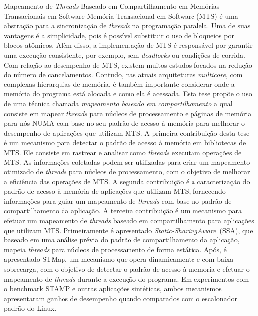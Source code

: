 \documentclass[tese,capa,english]{texufpel}
\begin{document}
\begin{englishabstract}{Mapeamento de \textit{Threads} Baseado em Compartilhamento em Memórias Transacionais em Software}
Memória Transacional em Software (MTS) é uma abstração para a sincronização de \textit{threads} na programação paralela. Uma de suas vantagens é a simplicidade, pois é possível substituir o uso de bloqueios por blocos atômicos. Além disso, a implementação de MTS é responsável por garantir uma execução consistente, por exemplo, sem \textit{deadlocks} ou condições de corrida. Com relação ao desempenho de MTS, existem muitos estudos focados na redução do número de cancelamentos. Contudo, nas atuais arquiteturas \textit{multicore}, com complexas hierarquias de memória, é também importante considerar onde a memória do programa está alocada e como ela é acessada. Esta tese propõe o uso de uma técnica chamada \emph{mapeamento baseado em compartilhamento} a qual consiste em mapear \textit{threads} para núcleos de processamento e páginas de memória para nós NUMA com base no seu padrão de acesso à memória para melhorar o desempenho de aplicações que utilizam MTS. A primeira contribuição desta tese é um mecanismo para detectar o padrão de acesso à memória em bibliotecas de MTS. Ele consiste em rastrear e analisar como \textit{threads} executam operações de MTS. As informações coletadas podem ser utilizadas para criar um mapeamento otimizado de \textit{threads} para núcleos de processamento, com o objetivo de melhorar a eficiência das operações de MTS. A segunda contribuição é a caracterização do padrão de acesso à memória de aplicações que utilizam MTS, fornecendo informações para guiar um mapeamento de \textit{threads} com base no padrão de compartilhamento da aplicação. A terceira contribuição é um mecanismo para efetuar um mapeamento de \textit{threads} baseado em compartilhamento para aplicações que utilizam MTS. Primeiramente é apresentado \emph{Static-SharingAware}~(SSA), que baseado em uma análise prévia do padrão de compartilhamento da aplicação, mapeia \textit{threads} para núcleos de processamento de forma estática. Após, é apresentado STMap, um mecanismo que opera dinamicamente e com baixa sobrecarga, com o objetivo de detectar o padrão de acesso à memoria e efetuar o mapeamento de \textit{threads} durante a execução do programa. Em experimentos com o benchmark STAMP e outras aplicações sintéticas, ambos mecanismos apresentaram ganhos de desempenho quando comparados com o escalonador padrão do Linux. %

\end{englishabstract}
\end{document}
